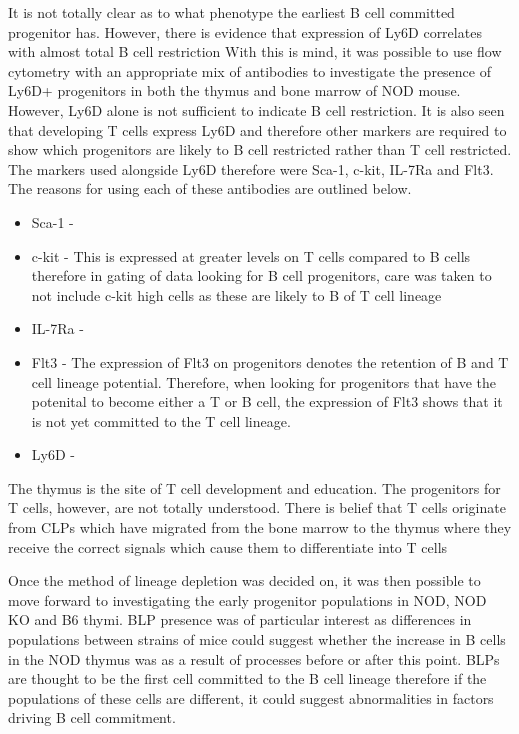 

 It is not totally clear as to what phenotype the earliest B cell committed progenitor has. 
 However, there is evidence that expression of Ly6D correlates with almost total B cell restriction %
 With this is mind, it was possible to use flow cytometry with an appropriate mix of antibodies to investigate the presence of Ly6D+ progenitors in both the thymus and bone marrow of NOD mouse.
However, Ly6D alone is not sufficient to indicate B cell restriction. 
It is also seen that developing T cells express Ly6D and therefore other markers are required to show which progenitors are likely to B cell restricted rather than T cell restricted.
The markers used alongside Ly6D therefore were Sca-1, c-kit, IL-7Ra and Flt3. 
The reasons for using each of these antibodies are outlined below.
\begin{itemize}
\item Sca-1 - 
\item c-kit - This is expressed at greater levels on T cells compared to B cells therefore in gating of data looking for B cell progenitors, care was taken to not include c-kit high cells as these are likely to B of T cell lineage %
\item IL-7Ra - 
\item Flt3 - The expression of Flt3 on progenitors denotes the retention of B and T cell lineage potential. Therefore, when looking for progenitors that have the potenital to become either a T or B cell, the expression of Flt3 shows that it is not yet committed to the T cell lineage.
\item Ly6D - %
\end{itemize}




The thymus is the site of T cell development and education.
The progenitors for T cells, however, are not totally understood. 
There is belief that T cells originate from CLPs which have migrated from the bone marrow to the thymus where they receive the correct signals which cause them to differentiate into T cells

Once the method of lineage depletion was decided on, it was then possible to move forward to investigating the early progenitor populations in NOD, NOD KO and B6 thymi.
BLP presence was of particular interest as differences in populations between strains of mice could suggest whether the increase in B cells in the NOD thymus was as a result of processes before or after this point.
BLPs are thought to be the first cell committed to the B cell lineage therefore if the populations of these cells are different, it could suggest abnormalities in factors driving B cell commitment.

